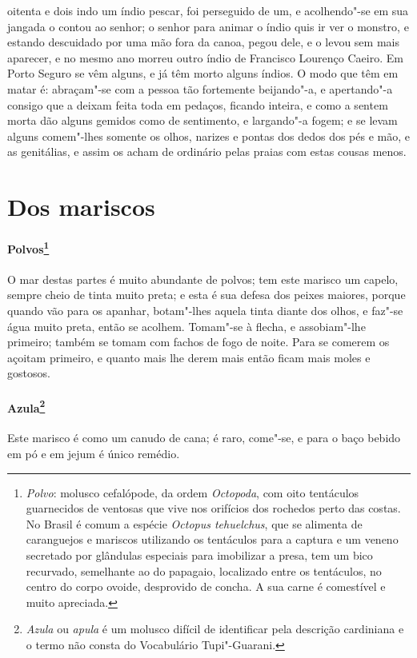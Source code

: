 oitenta e dois indo um índio pescar, foi perseguido de um, e
acolhendo"-se em sua jangada o contou ao senhor; o senhor para animar o
índio quis ir ver o monstro, e estando descuidado por uma mão fora da
canoa, pegou dele, e o levou sem mais aparecer, e no mesmo ano morreu
outro índio de Francisco Lourenço Caeiro. Em Porto Seguro se vêm
alguns, e já têm morto alguns índios. O modo que têm em matar é:
abraçam"-se com a pessoa tão fortemente beijando"-a, e apertando"-a
consigo que a deixam feita toda em pedaços, ficando inteira, e como a
sentem morta dão alguns gemidos como de sentimento, e largando"-a fogem;
e se levam alguns comem"-lhes somente os olhos, narizes e pontas dos
dedos dos pés e mão, e as genitálias, e assim os acham de ordinário
pelas praias com estas cousas menos.

\section{Dos mariscos}
\paragraph{Polvos\footnote{ \textit{Polvo}: molusco
cefalópode, da ordem \textit{Octopoda}, com oito tentáculos guarnecidos
de ventosas que vive nos orifícios dos rochedos perto das costas. No
Brasil é comum a espécie \textit{Octopus tehuelchus}, que se alimenta
de caranguejos e mariscos utilizando os tentáculos para a captura e um
veneno secretado por glândulas especiais para imobilizar a presa, tem
um bico recurvado, semelhante ao do papagaio, localizado entre os
tentáculos, no centro do corpo ovoide, desprovido de concha. A sua
carne é comestível e muito apreciada.}} O mar destas partes
é muito abundante de polvos; tem este marisco um capelo, sempre cheio
de tinta muito preta; e esta é sua defesa dos peixes maiores, porque
quando vão para os apanhar, botam"-lhes aquela tinta diante dos olhos, e
faz"-se água muito preta, então se acolhem. Tomam"-se à flecha, e
assobiam"-lhe primeiro; também se tomam com fachos de fogo de noite.
Para se comerem os açoitam primeiro, e quanto mais lhe derem mais então
ficam mais moles e gostosos.

\paragraph{Azula\footnote{ \textit{Azula} ou \textit{apula} é um
molusco difícil de identificar pela descrição cardiniana e o termo não
consta do Vocabulário Tupi"-Guarani.}} Este marisco é como um canudo de cana; 
é raro, come"-se, e para o baço bebido em pó e em jejum é único remédio.

